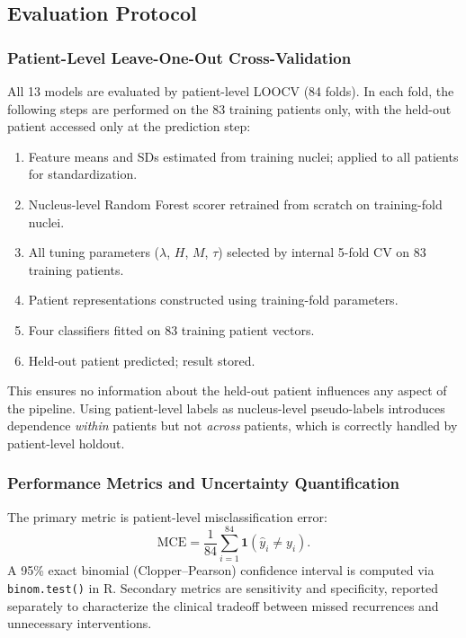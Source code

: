 \documentclass[12pt, onecolumn]{article}
\begin{document}
\subsection{Evaluation Protocol}

\subsubsection{Patient-Level Leave-One-Out Cross-Validation}

All 13 models are evaluated by patient-level LOOCV (84 folds). In
each fold, the following steps are performed on the 83 training
patients only, with the held-out patient accessed only at the
prediction step:
\begin{enumerate}[noitemsep, topsep=4pt, leftmargin=*, label=(\arabic*)]
  \item Feature means and SDs estimated from training nuclei;
        applied to all patients for standardization.
  \item Nucleus-level Random Forest scorer retrained from scratch
        on training-fold nuclei.
  \item All tuning parameters ($\lambda$, $H$, $M$, $\tau$)
        selected by internal 5-fold CV on 83 training patients.
  \item Patient representations constructed using training-fold
        parameters.
  \item Four classifiers fitted on 83 training patient vectors.
  \item Held-out patient predicted; result stored.
\end{enumerate}

This ensures no information about the held-out patient influences
any aspect of the pipeline. Using patient-level labels as
nucleus-level pseudo-labels introduces dependence \emph{within}
patients but not \emph{across} patients, which is correctly
handled by patient-level holdout.

\subsubsection{Performance Metrics and Uncertainty Quantification}

The primary metric is patient-level misclassification error:
\begin{equation}
  \mathrm{MCE} = \frac{1}{84}\sum_{i=1}^{84}
    \mathbf{1}(\hat{y}_i \neq y_i).
\end{equation}
A 95\% exact binomial (Clopper--Pearson) confidence interval is
computed via \texttt{binom.test()} in R. Secondary metrics are
sensitivity and specificity, reported separately to characterize
the clinical tradeoff between missed recurrences and unnecessary
interventions.
\end{document}
